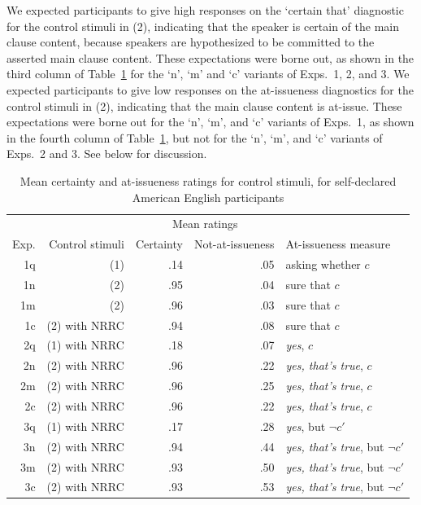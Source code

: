 \documentclass[a4paper,12pt,twoside]{article}
\begin{document}
    We expected participants to give high responses on the `certain that' diagnostic for the control stimuli in (2), indicating that the speaker is certain of the main clause content, because speakers are hypothesized to be committed to the asserted main clause content. These expectations were borne out, as shown in the third column of Table~\ref{t-controls} for the `n', `m' and `c' variants of Exps.~1, 2, and 3. We expected participants to give low responses on the at-issueness diagnostics for the control stimuli in (2), indicating that the main clause content is at-issue. These expectations were borne out for the `n', `m', and `c' variants of Exps.~1, as shown in the fourth column of Table~\ref{t-controls}, but not for the `n', `m', and `c' variants of Exps.~2 and 3. See below for discussion.

    \begin{table}[h!]
        \centering
        \begin{tabular}{r r r r l }
            & &  \multicolumn{2}{c}{Mean ratings} &  \\ 
            Exp. & Control stimuli & Certainty & Not-at-issueness & At-issueness measure \\ 
            \hline
            1q & (1) & .14 & .05  & asking whether $c$ \\
            1n & (2) &  .95 & .04 & sure that $c$\\
            1m & (2) & .96 & .03 & sure that $c$\\
            1c & (2) with NRRC & .94  & .08 & sure that $c$\\
            \hline
            2q & (1) with NRRC & .18 & .07 & {\em yes}, $c$\\
            2n & (2) with NRRC& .96 & .22 & {\em yes, that's true}, $c$\\
            2m & (2) with NRRC& .96 & .25 & {\em yes, that's true}, $c$\\
            2c & (2) with NRRC& .96 & .22 & {\em yes, that's true}, $c$\\
            \hline
            3q & (1) with NRRC & .17 &  .28 & {\em yes}, but $\neg c'$\\
            3n & (2) with NRRC & .94 & .44 & {\em yes, that's true}, but $\neg c'$\\
            3m & (2) with NRRC & .93 & .50 & {\em yes, that's true}, but $\neg c'$\\
            3c & (2) with NRRC & .93 & .53 & {\em yes, that's true}, but $\neg c'$\\
            \hline
        \end{tabular}
        \caption{Mean certainty and at-issueness ratings for control stimuli, for self-declared American English participants}\label{t-controls}
    \end{table}
\end{document}
